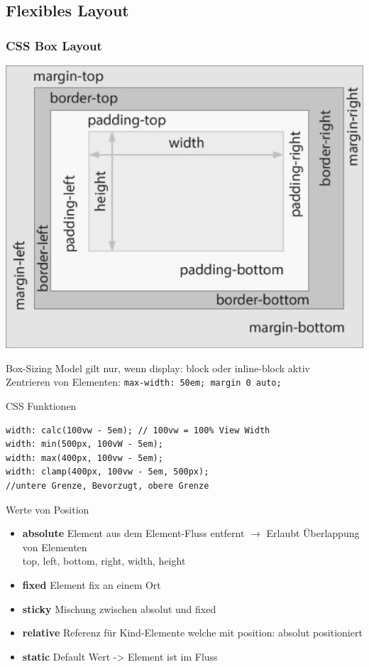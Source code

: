 \subsection{Flexibles Layout}

\subsubsection{CSS Box Layout}
\begin{minipage}{0.7\linewidth}
\begin{center}
    \includegraphics[width=\linewidth]{graphic/responsive/boxmodel.png}
\vspace{-8pt}
\end{center}
\end{minipage}
\begin{minipage}{0.287\linewidth}
    Box-Sizing Model gilt nur, wenn display: block oder inline-block aktiv\\
    Zentrieren von Elementen: \texttt{max-width: 50em; margin 0 auto;}
\end{minipage}
\textcolor{subsectioncolor}{CSS Funktionen}
\begin{lstlisting}
width: calc(100vw - 5em); // 100vw = 100% View Width
width: min(500px, 100vW - 5em);
width: max(400px, 100vw - 5em);
width: clamp(400px, 100vw - 5em, 500px);
//untere Grenze, Bevorzugt, obere Grenze
\end{lstlisting}
\textcolor{subsectioncolor}{Werte von Position}
\begin{itemize}
    \item \textbf{absolute} Element aus dem Element-Fluss entfernt $\rightarrow$ Erlaubt Überlappung von Elementen \\
    top, left, bottom, right, width, height
    \item \textbf{fixed} Element fix an einem Ort
    \item \textbf{sticky} Mischung zwischen absolut und fixed
    \item \textbf{relative} Referenz für Kind-Elemente welche mit position: absolut positioniert
    \item \textbf{static} Default Wert -> Element ist im Fluss
\end{itemize}


